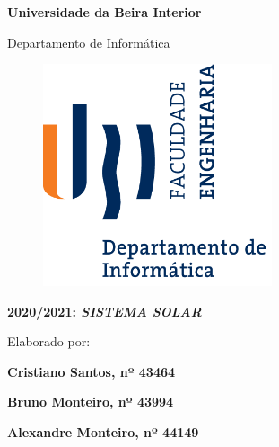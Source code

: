
\thispagestyle{empty}
\setcounter{page}{-1}

\begin{center}
\begin{Huge}
\textbf{Universidade da Beira Interior}
\end{Huge}
\end{center}

\begin{center}
\begin{Huge}
Departamento de Informática
\end{Huge}
\end{center}

\vspace{0,07cm}
\begin{figure}[!htb]
\centering
\includegraphics[width=191pt]{ubi-fe-di.png}
\end{figure}

\vspace{0.5cm}
\begin{center}
\begin{Large}
\textbf{2020/2021: \emph{SISTEMA SOLAR}}
\end{Large}
\end{center}


\vspace{0.5cm}
\begin{center}
\begin{normalsize}
\begin{large}
Elaborado por:
\end{large}
\end{normalsize}
\end{center}


\begin{center}
\begin{large}
\textbf{Cristiano Santos, nº 43464}


\textbf{Bruno Monteiro, nº 43994}


\textbf{Alexandre Monteiro, nº 44149}
\end{large}
\end{center}

